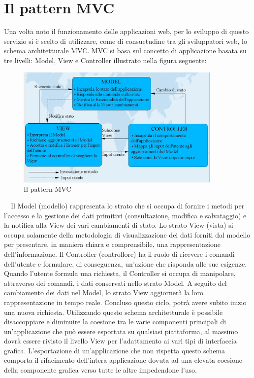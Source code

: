\section{Il pattern MVC} %
\label{sec:il_pattern_mvc}

Una volta noto il funzionamento delle applicazioni web, per lo sviluppo di questo servizio si è scelto di utilizzare, come di consuetudine tra gli sviluppatori web, lo schema architetturale MVC.
MVC si basa sul concetto di applicazione basata su tre livelli: Model, View e Controller illustrato nella figura seguente:

\begin{figure}[htbp]
\begin{center}
\includegraphics[width=10cm]{contents/images/mvc}
\end{center}
\caption{Il pattern MVC}
\label{fig:mvc}
\end{figure}
  
Il Model (modello) rappresenta lo strato che si occupa di fornire i metodi per l’accesso e la gestione dei dati primitivi (consultazione, modifica e salvataggio)  e la notifica alla View dei vari cambiamenti di stato.
Lo strato View (vista) si occupa solamente della metodologia di visualizzazione dei dati forniti dal modello per presentare, in maniera chiara e comprensibile, una rappresentazione dell’informazione.
Il Controller (controllore) ha il ruolo di ricevere i comandi dell’utente e formulare, di conseguenza, un’azione che risponda alle sue esigenze.
Quando l’utente formula una richiesta, il Controller si occupa di manipolare, attraverso dei comandi, i dati conservati nello strato Model. A seguito del cambiamento dei dati nel Model, lo strato View aggiornerà la loro rappresentazione in tempo reale. Concluso questo ciclo, potrà avere subito inizio una nuova richiesta. 
Utilizzando questo schema architetturale è possibile disaccoppiare e diminuire la coesione tra le varie componenti principali di un’applicazione che può essere esportata su qualsiasi piattaforma, al massimo dovrà essere rivisto il livello View per l’adattamento ai vari tipi di interfaccia grafica. 
L’esportazione di un’applicazione che non rispetta questo schema comporta il rifacimento dell’intera applicazione dovuta ad una elevata coesione della componente grafica verso tutte le altre impedendone l’uso. 

